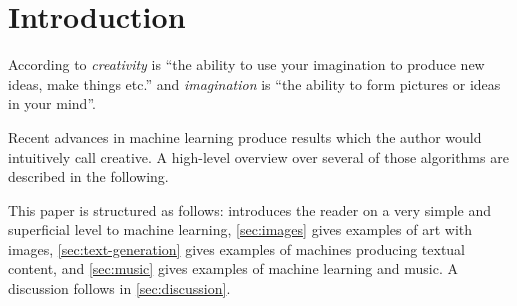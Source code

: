 
\section{Introduction}
\label{sec:introduction}
According to \cite{LongmanDCE06} \textit{creativity} is \enquote{the ability to
use your imagination to produce new ideas, make things etc.} and
\textit{imagination} is \enquote{the ability to form pictures or ideas in your
mind}.

Recent advances in machine learning produce results which the author would
intuitively call creative. A high-level overview over several of those
algorithms are described in the following.

This paper is structured as follows:  introduces the
reader on a very simple and superficial level to machine learning,
\cref{sec:images} gives examples of art with images, \cref{sec:text-generation}
gives examples of machines producing textual content, and \cref{sec:music}
gives examples of machine learning and music. A discussion follows in
\cref{sec:discussion}.
